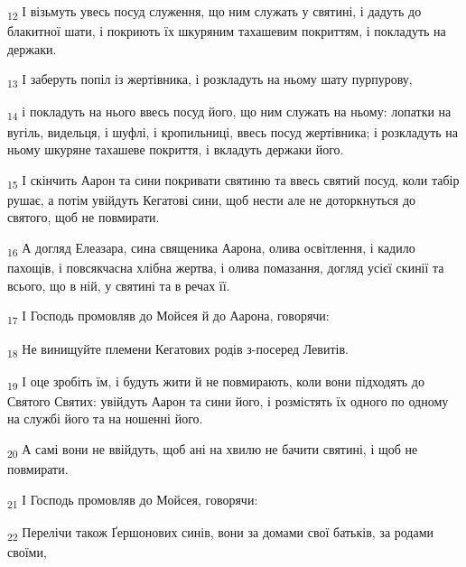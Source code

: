 \begin{tcolorbox}
\textsubscript{12} І візьмуть увесь посуд служення, що ним служать у святині, і дадуть до блакитної шати, і покриють їх шкуряним тахашевим покриттям, і покладуть на держаки.
\end{tcolorbox}
\begin{tcolorbox}
\textsubscript{13} І заберуть попіл із жертівника, і розкладуть на ньому шату пурпурову,
\end{tcolorbox}
\begin{tcolorbox}
\textsubscript{14} і покладуть на нього ввесь посуд його, що ним служать на ньому: лопатки на вугіль, видельця, і шуфлі, і кропильниці, ввесь посуд жертівника; і розкладуть на ньому шкуряне тахашеве покриття, і вкладуть держаки його.
\end{tcolorbox}
\begin{tcolorbox}
\textsubscript{15} І скінчить Аарон та сини покривати святиню та ввесь святий посуд, коли табір рушає, а потім увійдуть Кегатові сини, щоб нести але не доторкнуться до святого, щоб не повмирати.
\end{tcolorbox}
\begin{tcolorbox}
\textsubscript{16} А догляд Елеазара, сина священика Аарона, олива освітлення, і кадило пахощів, і повсякчасна хлібна жертва, і олива помазання, догляд усієї скинії та всього, що в ній, у святині та в речах її.
\end{tcolorbox}
\begin{tcolorbox}
\textsubscript{17} І Господь промовляв до Мойсея й до Аарона, говорячи:
\end{tcolorbox}
\begin{tcolorbox}
\textsubscript{18} Не винищуйте племени Кегатових родів з-посеред Левитів.
\end{tcolorbox}
\begin{tcolorbox}
\textsubscript{19} І оце зробіть їм, і будуть жити й не повмирають, коли вони підходять до Святого Святих: увійдуть Аарон та сини його, і розмістять їх одного по одному на службі його та на ношенні його.
\end{tcolorbox}
\begin{tcolorbox}
\textsubscript{20} А самі вони не ввійдуть, щоб ані на хвилю не бачити святині, і щоб не повмирати.
\end{tcolorbox}
\begin{tcolorbox}
\textsubscript{21} І Господь промовляв до Мойсея, говорячи:
\end{tcolorbox}
\begin{tcolorbox}
\textsubscript{22} Перелічи також Ґершонових синів, вони за домами свої батьків, за родами своїми,
\end{tcolorbox}
